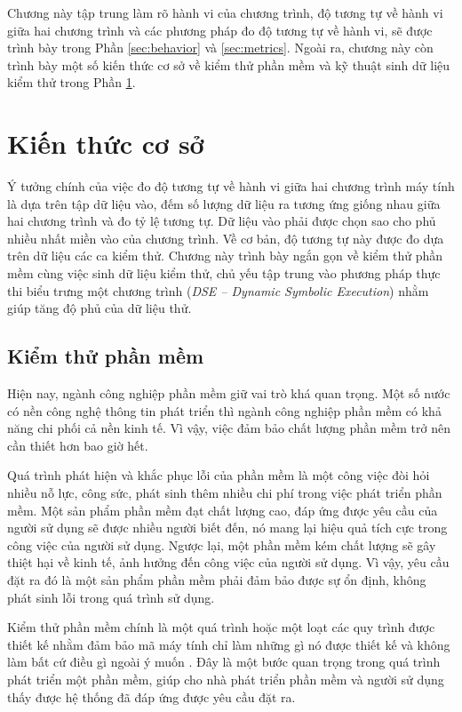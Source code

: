 Chương này tập trung làm rõ hành vi của chương trình, độ tương tự về
hành vi giữa hai chương trình và các phương pháp đo độ tương tự về
hành vi, sẽ được trình bày trong Phần \ref{sec:behavior} và
\ref{sec:metrics}. Ngoài ra, chương này còn trình bày một số kiến thức
cơ sở về kiểm thử phần mềm và kỹ thuật sinh dữ liệu kiểm thử trong Phần \ref{sec:base}.

\section{Kiến thức cơ sở}
\label{sec:base}

Ý tưởng chính của việc đo độ tương tự về hành vi giữa hai chương trình
máy tính là dựa trên tập dữ liệu vào, đếm số lượng dữ liệu ra tương
ứng giống nhau giữa hai chương trình và đo tỷ lệ tương tự. Dữ liệu vào
phải được chọn sao cho phủ nhiều nhất miền vào của chương trình. Về cơ
bản, độ tương tự này được đo dựa trên dữ liệu các ca kiểm thử. Chương
này trình bày ngắn gọn về kiểm thử phần mềm cùng việc sinh dữ liệu
kiểm thử, chủ yếu tập trung vào phương pháp thực thi biểu trưng một
chương trình (\emph{DSE -- Dynamic Symbolic Execution}) nhằm giúp tăng độ phủ
của dữ liệu thử.

\subsection{Kiểm thử phần mềm}
Hiện nay, ngành công nghiệp phần mềm giữ vai trò khá quan trọng. Một
số nước có nền công nghệ thông tin phát triển thì ngành công nghiệp
phần mềm có khả năng chi phối cả nền kinh tế. Vì vậy, việc đảm bảo
chất lượng phần mềm trở nên cần thiết hơn bao giờ hết.

Quá trình phát hiện và khắc phục lỗi của phần mềm là một công việc đòi hỏi nhiều nỗ lực, công sức, phát sinh thêm nhiều chi phí trong việc phát triển phần mềm. Một sản phẩm phần mềm đạt chất lượng cao, đáp ứng được yêu cầu của người sử dụng sẽ được nhiều người biết đến, nó mang lại hiệu quả tích cực trong công việc của người sử dụng. Ngược lại, một phần mềm kém chất lượng sẽ gây thiệt hại về kinh tế, ảnh hưởng đến công việc của người sử dụng. Vì vậy, yêu cầu đặt ra đó là một sản phẩm phần mềm phải đảm bảo được sự ổn định, không phát sinh lỗi trong quá trình sử dụng.

Kiểm thử phần mềm chính là một quá trình hoặc một loạt các quy trình
được thiết kế nhằm đảm bảo mã máy tính chỉ làm những gì nó được thiết
kế và không làm bất cứ điều gì ngoài ý muốn \cite{myers2011art}. Đây
là một bước quan trọng trong quá trình phát triển một phần mềm, giúp
cho nhà phát triển phần mềm và người sử dụng thấy được hệ thống đã đáp
ứng được yêu cầu đặt ra.

